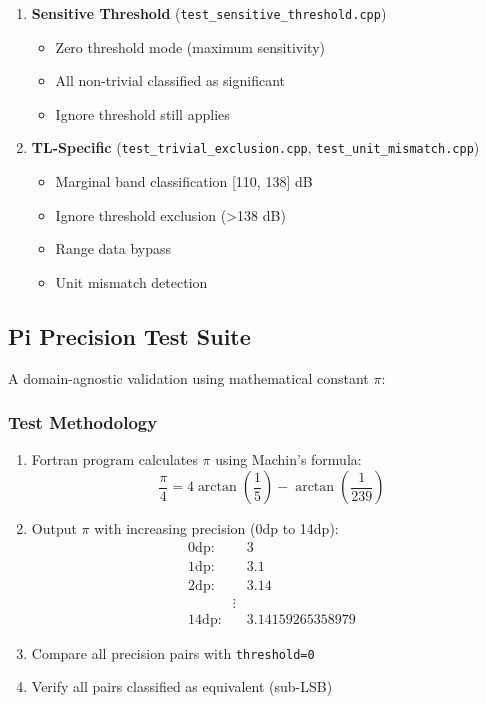 \begin{enumerate}
    \item \textbf{Sensitive Threshold} (\texttt{test\_sensitive\_threshold.cpp})
    \begin{itemize}
        \item Zero threshold mode (maximum sensitivity)
        \item All non-trivial classified as significant
        \item Ignore threshold still applies
    \end{itemize}

    \item \textbf{TL-Specific} (\texttt{test\_trivial\_exclusion.cpp}, \texttt{test\_unit\_mismatch.cpp})
    \begin{itemize}
        \item Marginal band classification [110, 138] dB
        \item Ignore threshold exclusion (>138 dB)
        \item Range data bypass
        \item Unit mismatch detection
    \end{itemize}
\end{enumerate}

\subsection{Pi Precision Test Suite}

A domain-agnostic validation using mathematical constant $\pi$:

\subsubsection{Test Methodology}

\begin{enumerate}
    \item Fortran program calculates $\pi$ using Machin's formula:
    \begin{equation}
        \frac{\pi}{4} = 4 \arctan\left(\frac{1}{5}\right) - \arctan\left(\frac{1}{239}\right)
    \end{equation}

    \item Output $\pi$ with increasing precision (0dp to 14dp):
    \begin{align*}
        0\text{dp:} & \quad 3 \\
        1\text{dp:} & \quad 3.1 \\
        2\text{dp:} & \quad 3.14 \\
        & \vdots \\
        14\text{dp:} & \quad 3.14159265358979
    \end{align*}

    \item Compare all precision pairs with \texttt{threshold=0}

    \item Verify all pairs classified as equivalent (sub-LSB)
\end{enumerate}

